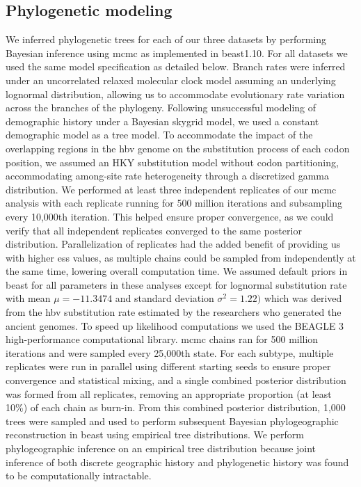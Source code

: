 \subsection{Phylogenetic modeling}

We inferred phylogenetic trees for each of our three datasets by performing Bayesian inference using \gls{mcmc} as implemented in \gls{beast}1.10\cite{suchard2018bayesian}.
For all datasets we used the same model specification as detailed below.
Branch rates were inferred under an uncorrelated relaxed molecular clock model assuming an underlying lognormal distribution, allowing us to accommodate evolutionary rate variation across the branches of the phylogeny.
Following unsuccessful modeling of demographic history under a Bayesian skygrid model\cite{gill2013improving}, we used a constant demographic model as a tree model. %
To accommodate the impact of the overlapping regions in the \gls{hbv} genome on the substitution process of each codon position, we assumed an HKY substitution model\cite{hasegawa1985dating} without codon partitioning, accommodating among-site rate heterogeneity through a discretized gamma distribution\cite{yang1993maximum}.
We performed at least three independent replicates of our \gls{mcmc} analysis with each replicate running for 500 million iterations and subsampling every 10,000th iteration.
This helped ensure proper convergence, as we could verify that all independent replicates converged to the same posterior distribution.
Parallelization of replicates had the added benefit of providing us with higher \gls{ess} values, as multiple chains could be sampled from independently at the same time, lowering overall computation time.
We assumed default priors in \gls{beast} for all parameters in these analyses except for lognormal substitution rate with mean $\mu=-11.3474$ and standard deviation $\sigma^{2}=1.22)$ which was derived from the \gls{hbv} substitution rate estimated by the researchers who generated the ancient genomes\cite{muhlemann2018ancient}.
To speed up likelihood computations we used the BEAGLE 3 high-performance computational library.
\gls{mcmc} chains ran for 500 million iterations and were sampled every 25,000th state.
For each subtype, multiple replicates were run in parallel using different starting seeds to ensure proper convergence and statistical mixing, and a single combined posterior distribution was formed from all replicates, removing an appropriate proportion (at least 10\%) of each chain as burn-in.
From this combined posterior distribution, 1,000 trees were sampled and used to perform subsequent Bayesian phylogeographic reconstruction in \gls{beast} using empirical tree distributions.
We perform phylogeographic inference on an empirical tree distribution because joint inference of both discrete geographic history and phylogenetic history was found to be computationally intractable.

